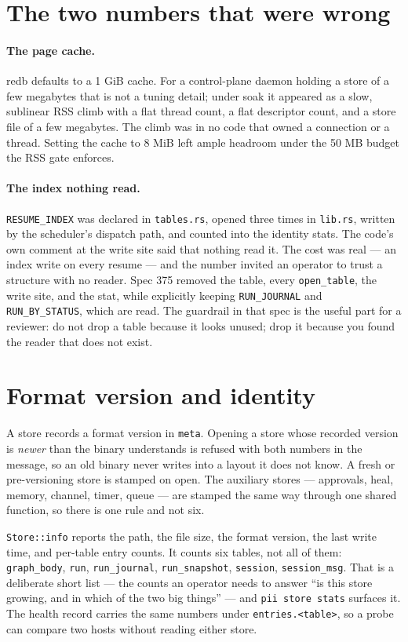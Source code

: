 \section{The two numbers that were wrong}

\paragraph{The page cache.} redb defaults to a 1 GiB cache. For a control-plane daemon holding
a store of a few megabytes that is not a tuning detail; under soak it appeared as a slow,
sublinear RSS climb with a flat thread count, a flat descriptor count, and a store file of a
few megabytes. The climb was in no code that owned a connection or a thread. Setting the cache
to 8 MiB left ample headroom under the 50 MB budget the RSS gate enforces.

\paragraph{The index nothing read.} \texttt{RESUME\_INDEX} was declared in \texttt{tables.rs},
opened three times in \texttt{lib.rs}, written by the scheduler's dispatch path, and counted
into the identity stats. The code's own comment at the write site said that nothing read it.
The cost was real --- an index write on every resume --- and the number invited an operator to
trust a structure with no reader. Spec 375 removed the table, every \texttt{open\_table}, the
write site, and the stat, while explicitly keeping \texttt{RUN\_JOURNAL} and
\texttt{RUN\_BY\_STATUS}, which are read. The guardrail in that spec is the useful part for a
reviewer: do not drop a table because it looks unused; drop it because you found the reader
that does not exist.

\section{Format version and identity}

A store records a format version in \texttt{meta}. Opening a store whose recorded version is
\emph{newer} than the binary understands is refused with both numbers in the message, so an
old binary never writes into a layout it does not know. A fresh or pre-versioning store is
stamped on open. The auxiliary stores --- approvals, heal, memory, channel, timer, queue ---
are stamped the same way through one shared function, so there is one rule and not six.

\texttt{Store::info} reports the path, the file size, the format version, the last write time,
and per-table entry counts. It counts six tables, not all of them: \texttt{graph\_body},
\texttt{run}, \texttt{run\_journal}, \texttt{run\_snapshot}, \texttt{session},
\texttt{session\_msg}. That is a deliberate short list --- the counts an operator needs to
answer ``is this store growing, and in which of the two big things'' --- and \texttt{pii store
stats} surfaces it. The health record carries the same numbers under \texttt{entries.<table>},
so a probe can compare two hosts without reading either store.

